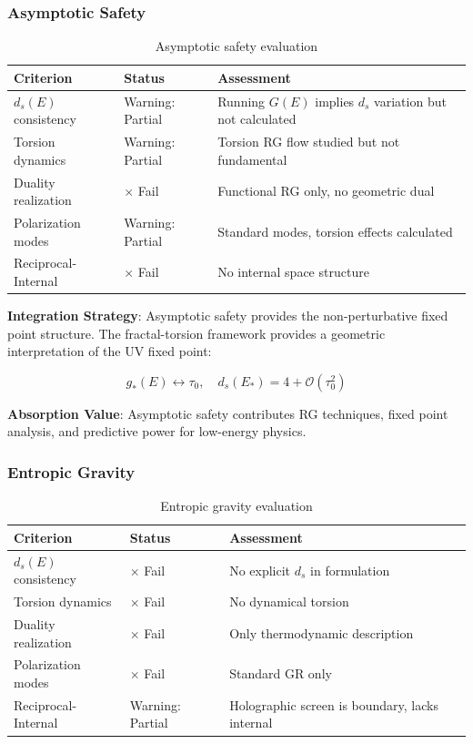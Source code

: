 \subsubsection{Asymptotic Safety}

\begin{table}[h]
\centering
\begin{tabular}{p{3.5cm}p{2cm}p{6cm}}
\toprule
\textbf{Criterion} & \textbf{Status} & \textbf{Assessment} \\
\midrule
$d_s(E)$ consistency & Warning: Partial & Running $G(E)$ implies $d_s$ variation but not calculated \\
Torsion dynamics & Warning: Partial & Torsion RG flow studied but not fundamental \\
Duality realization & $\times$ Fail & Functional RG only, no geometric dual \\
Polarization modes & Warning: Partial & Standard modes, torsion effects calculated \\
Reciprocal-Internal & $\times$ Fail & No internal space structure \\
\bottomrule
\end{tabular}
\caption{Asymptotic safety evaluation}
\end{table}

\textbf{Integration Strategy}:
Asymptotic safety provides the non-perturbative fixed point structure. The fractal-torsion framework provides a geometric interpretation of the UV fixed point:

\begin{equation}
    g_*(E) \leftrightarrow \tau_0, \quad d_s(E_*) = 4 + \mathcal{O}(\tau_0^2)
\end{equation}

\textbf{Absorption Value}: Asymptotic safety contributes RG techniques, fixed point analysis, and predictive power for low-energy physics.

\subsubsection{Entropic Gravity}

\begin{table}[h]
\centering
\begin{tabular}{p{3.5cm}p{2cm}p{6cm}}
\toprule
\textbf{Criterion} & \textbf{Status} & \textbf{Assessment} \\
\midrule
$d_s(E)$ consistency & $\times$ Fail & No explicit $d_s$ in formulation \\
Torsion dynamics & $\times$ Fail & No dynamical torsion \\
Duality realization & $\times$ Fail & Only thermodynamic description \\
Polarization modes & $\times$ Fail & Standard GR only \\
Reciprocal-Internal & Warning: Partial & Holographic screen is boundary, lacks internal \\
\bottomrule
\end{tabular}
\caption{Entropic gravity evaluation}
\end{table}

